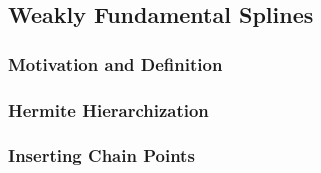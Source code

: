 \blindtext{}



\subsection{Weakly Fundamental Splines}
\label{sec:444weaklyFundamentalSplines}

\blindtext{}

\subsubsection{Motivation and Definition}

\blindtext{}

\subsubsection{Hermite Hierarchization}

\blindtext{}

\subsubsection{Inserting Chain Points}

\blindtext{}
